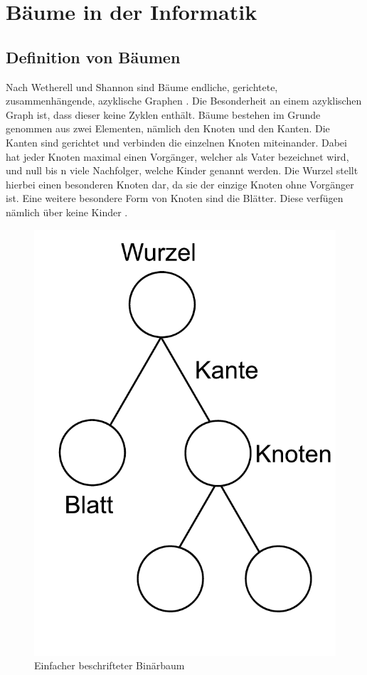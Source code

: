 \chapter{Bäume in der Informatik}
\label{chap:kapitel2}

\section{Definition von Bäumen}

Nach Wetherell und Shannon sind Bäume endliche, gerichtete, zusammenhängende, azyklische Graphen \cite[]{q1}. 
Die Besonderheit an einem azyklischen Graph ist, dass dieser keine Zyklen enthält. Bäume bestehen im Grunde genommen 
aus zwei Elementen, nämlich den Knoten und den Kanten. Die Kanten sind gerichtet und verbinden die einzelnen 
Knoten miteinander. Dabei hat jeder Knoten maximal einen Vorgänger, welcher als Vater bezeichnet wird, und null 
bis n viele Nachfolger, welche Kinder genannt werden. Die Wurzel stellt hierbei einen besonderen Knoten dar, da sie der 
einzige Knoten ohne Vorgänger ist. Eine weitere besondere Form von Knoten sind die Blätter. Diese verfügen nämlich über 
keine Kinder \cite{q4}.

\begin{figure}[H]
    \centering
    \includegraphics[scale = 0.5]{abbildungen/simple_tree}
    \caption{Einfacher beschrifteter Binärbaum}
    \label{pic:simple_tree} 
\end{figure}

